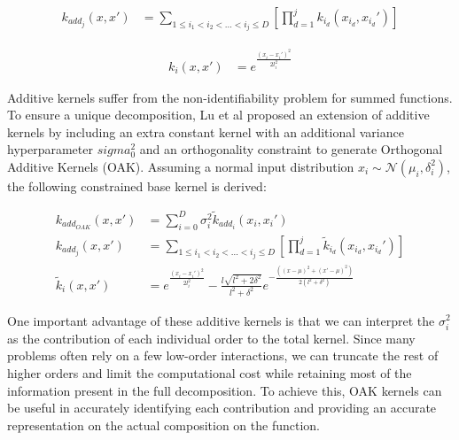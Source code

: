 \documentclass{IOS-Book-Article}
\begin{document}
	\begin{equation} \label{eq:additive2}
		\begin{aligned}
			k_{add_j}(x,x') &= \sum_{1\leq i_1 < i_2 < \ldots < i_j\leq D} \left[\prod_{d=1}^{j} k_{i_d}(x_{i_d},x_{i_d}') \right]
		\end{aligned}
	\end{equation}
	
	\begin{equation} \label{eq:additive3}
		\begin{aligned}
			k_i(x,x') &= e^{\frac{(x_i-x_i')^2}{2l_i^2}}
		\end{aligned}
	\end{equation}
	
	Additive kernels suffer from the non-identifiability problem for summed functions. To ensure a unique decomposition, Lu et al\cite{gp-additive-orthogonal} proposed an extension of additive kernels by including an extra constant kernel with an additional variance hyperparameter $sigma_0^2$ and an orthogonality constraint to generate Orthogonal Additive Kernels (OAK)\cite{gp-additive-orthogonal}. Assuming a normal input distribution $x_i \sim \mathcal{N}(\mu_i, \delta_i^2)$, the following constrained base kernel is derived:
	
	\begin{equation} \label{eq:additive-orthogonal}
		\begin{aligned}
			k_{add_{OAK}}(x,x') &= \sum_{i=0}^D{\sigma_i^2  \tilde{k}_{add_i}(x_i,x_i')} \\
			k_{add_j}(x,x') &= \sum_{1\leq i_1 < i_2 < \ldots < i_j\leq D} \left[\prod_{d=1}^{j} \tilde{k}_{i_d}(x_{i_d},x_{i_d}') \right]\\		
			\tilde{k}_i(x,x') &= e^{\frac{(x_i-x_i')^2}{2l_i^2}} - \frac{l\sqrt{l^2 + 2\delta^2}}{l^2 + \delta^2} e^{-\frac{((x-\mu)^2 + (x'-\mu)^2)}{2(l^2 + \delta^2)}}
		\end{aligned}
	\end{equation}
	
	One important advantage of these additive kernels is that we can interpret the $\sigma_i^2$ as the contribution of each individual order to the total kernel. Since many problems often rely on a few low-order interactions, we can truncate the rest of higher orders and limit the computational cost while retaining most of the information present in the full decomposition. To achieve this, OAK kernels can be useful in accurately identifying each contribution and providing an accurate representation on the actual composition on the function.
	
\end{document}
